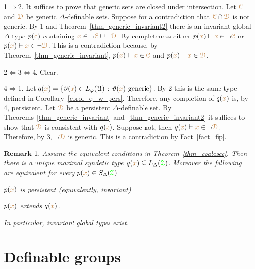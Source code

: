 \documentclass[10pt,openany]{amsproc}
\makeatletter
\newcommand{\mylabel}[1]{{\ssf{#1}}\hfill}
\renewenvironment{itemize}
  {\begin{list}{}{%
   \setlength{\parskip}{0mm}
   \setlength{\topsep}{.2\baselineskip}
   \setlength{\rightmargin}{0mm}
   \setlength{\listparindent}{0mm}
   \setlength{\itemindent}{0mm}
   \setlength{\labelwidth}{2ex}
   \setlength{\itemsep}{.1\baselineskip}
   \setlength{\parsep}{0mm}
   \setlength{\partopsep}{0mm}
   \setlength{\labelsep}{1ex}
   \setlength{\leftmargin}{\labelwidth+\labelsep}
   \let\makelabel\mylabel
   }}
   {\vspace*{-.3\baselineskip}\end{list}}
\def\proves{\vdash}
\def\IMP{\Rightarrow}
\def\IFF{\Leftrightarrow}
\def\D{\EuScript D}
\def\Z{\EuScript Z}
\def\C{\EuScript C}
\def\U{\EuScript U}
\def\theta{\vartheta}
\def\phi{\varphi}
\def\ssf#1{\textsf{\small #1}}
\newcounter{thm}
\theoremstyle{mio}
\newtheorem{remark}[thm]{Remark}\tcolorboxenvironment{remark}{mythm}
\providecommand{\proofNameStyle}{\bfseries}
\renewenvironment{proof}[1][\proofname]{\par
  \pushQED{\qed}%
  \normalfont%
  \trivlist
  \item[\hskip\labelsep
        \proofNameStyle
    #1\@addpunct{.}]\ignorespaces
}{%
  \popQED\endtrivlist\@endpefalse
}
\def\mr{\color{brown}}
\def\gr{\color{green}}
\def\mrC{{\mr\C}}
\def\mrD{{\mr\D}}
\def\grZ{{\gr\Z}}
\makeatother
\begin{document}
\begin{proof}
  \ssf1$\IMP$\ssf2.
  It suffices to prove that generic sets are closed under intersection.
  Let $\mrC$ and $\mrD$ be generic $\Delta$-definable sets.
  Suppose for a contradiction that $\mrC\cap\mrD$ is not generic.
  By \ssf1 and Theorem~\ref{thm_generic_invariant2} there is an invariant global $\Delta$-type $p({\mr x})$ containing ${\mr x}\in\neg\mrC\cup\neg\mrD$.
  By completeness either $p({\mr x})\proves{\mr x}\in\neg\mrC$ or $p({\mr x})\proves{\mr x}\in\neg\mrD$.
  This is a contradiction because, by Theorem~\ref{thm_generic_invariant}, $p({\mr x})\proves{\mr x}\in\mrC$ and $p({\mr x})\proves{\mr x}\in\mrD$.

  \ssf2$\IFF$\ssf3$\IFF$\ssf4. Clear.

  \ssf4$\IMP$\ssf1.
  Let $q({\mr x})=\{\theta({\mr x})\in L_\phi(\U)\,:\,\theta({\mr x})\textrm{ generic}\}$.
  By \ssf2 this is the same type defined in Corollary~\ref{corol_q_w_pers}.
  Therefore, any completion of $q({\mr x})$ is, by \ssf4, persistent.
  Let $\mrD$ be a persistent $\Delta$-definable set.
  By Theorems~\ref{thm_generic_invariant} and~\ref{thm_generic_invariant2} it suffices to show that $\mrD$ is consistent with $q({\mr x})$.
  Suppose not, then $q({\mr x})\proves {\mr x}\in\neg\mrD$.
  Therefore, by \ssf3, $\neg\mrD$ is generic.
  This is a contradiction by Fact~\ref{fact_fip}.
\end{proof}

\begin{remark}\label{rem_coalesce}
  Assume the equivalent conditions in Theorem~\ref{thm_coalesce}.
  Then there is a unique maximal syndetic type $q({\mr x})\subseteq L_\Delta(\grZ)$.
  Moreover the following are equivalent for every $p({\mr x})\in S_\Delta(\grZ)$
  \begin{itemize}
    \item[1.] $p({\mr x})$ is persistent (equivalently, invariant)
    \item[2.] $p({\mr x})$ extends $q({\mr x})$.
  \end{itemize}
  In particular, invariant global types exist.
\end{remark}

\section{Definable groups}\label{definable}
\end{document}
